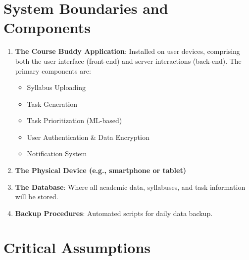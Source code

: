 \documentclass{article}
\begin{document}
\section{System Boundaries and Components}
\begin{enumerate}
    \item \textbf{The Course Buddy Application}: Installed on user devices, comprising both the user interface (front-end) and server interactions (back-end). The primary components are:
    \begin{itemize}
        \item Syllabus Uploading
        \item Task Generation
        \item Task Prioritization (ML-based)
        \item User Authentication \& Data Encryption
        \item Notification System
    \end{itemize}
    
    \item \textbf{The Physical Device (e.g., smartphone or tablet)}
    \item \textbf{The Database}: Where all academic data, syllabuses, and task information will be stored.
    \item \textbf{Backup Procedures}: Automated scripts for daily data backup.
\end{enumerate}

\section{Critical Assumptions}
\end{document}
